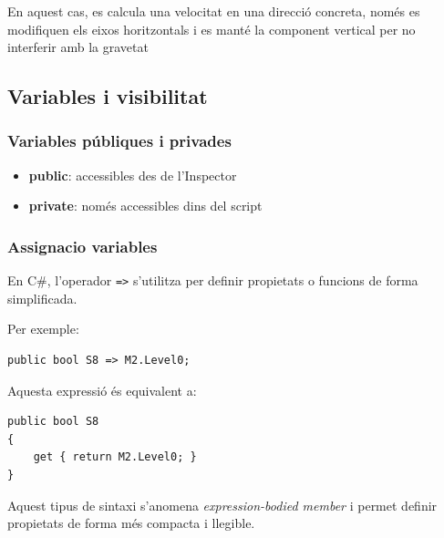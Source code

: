 \documentclass[12pt,a4paper]{report}
\begin{document}
En aquest cas, es calcula una velocitat en una direcció concreta, només es modifiquen els eixos horitzontals i es manté la component vertical per no interferir amb la gravetat


%
%
%

\subsection{Variables i visibilitat}

\subsubsection{Variables públiques i privades}

\begin{itemize}
\item \textbf{public}: accessibles des de l'Inspector \cite{MicrosoftFields}
\item \textbf{private}: només accessibles dins del script
\end{itemize}


\subsubsection{Assignacio variables}
En C\#, l'operador \texttt{=>} s'utilitza per definir propietats o funcions de forma simplificada.

Per exemple:

\begin{lstlisting}[language=CSharp]
public bool S8 => M2.Level0;
\end{lstlisting}

Aquesta expressió és equivalent a:

\begin{lstlisting}[language=CSharp]
public bool S8
{
    get { return M2.Level0; }
}
\end{lstlisting}

Aquest tipus de sintaxi s'anomena \textit{expression-bodied member} \cite{MicrosoftExpressionBodied} i permet definir propietats de forma més compacta i llegible.
\end{document}
